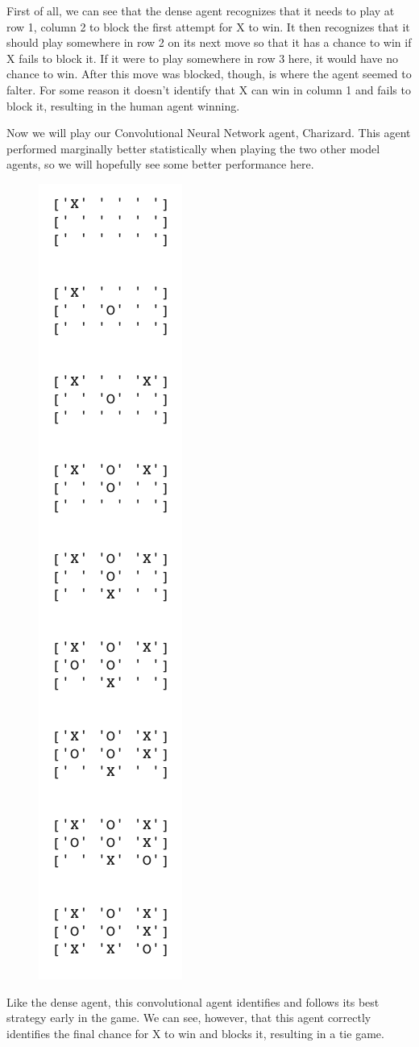First of all, we can see that the dense agent recognizes that it needs to play at row 1, column 2 to block the first attempt for X to win.
It then recognizes that it should play somewhere in row 2 on its next move so that it has a chance to win if X fails to block it.
If it were to play somewhere in row 3 here, it would have no chance to win.
After this move was blocked, though, is where the agent seemed to falter.
For some reason it doesn't identify that X can win in column 1 and fails to block it, resulting in the human agent winning.

Now we will play our Convolutional Neural Network agent, Charizard.
This agent performed marginally better statistically when playing the two other model agents, so we will hopefully see some better performance here.

\begin{figure}[H]
	\centering
	\includegraphics[scale=.5]{h_v_conv}
\end{figure}

Like the dense agent, this convolutional agent identifies and follows its best strategy early in the game.
We can see, however, that this agent correctly identifies the final chance for X to win and blocks it, resulting in a tie game.

